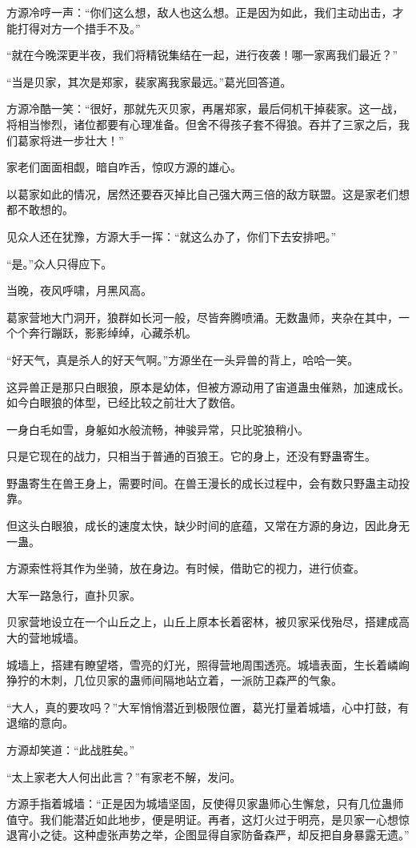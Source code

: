 \begin{this_body}
方源冷哼一声：“你们这么想，敌人也这么想。正是因为如此，我们主动出击，才能打得对方一个措手不及。”

“就在今晚深更半夜，我们将精锐集结在一起，进行夜袭！哪一家离我们最近？”

“当是贝家，其次是郑家，裴家离我家最远。”葛光回答道。

方源冷酷一笑：“很好，那就先灭贝家，再屠郑家，最后伺机干掉裴家。这一战，将相当惨烈，诸位都要有心理准备。但舍不得孩子套不得狼。吞并了三家之后，我们葛家将进一步壮大！”

家老们面面相觑，暗自咋舌，惊叹方源的雄心。

以葛家如此的情况，居然还要吞灭掉比自己强大两三倍的敌方联盟。这是家老们想都不敢想的。

见众人还在犹豫，方源大手一挥：“就这么办了，你们下去安排吧。”

“是。”众人只得应下。

当晚，夜风呼啸，月黑风高。

葛家营地大门洞开，狼群如长河一般，尽皆奔腾喷涌。无数蛊师，夹杂在其中，一个个奔行蹦跃，影影绰绰，心藏杀机。

“好天气，真是杀人的好天气啊。”方源坐在一头异兽的背上，哈哈一笑。

这异兽正是那只白眼狼，原本是幼体，但被方源动用了宙道蛊虫催熟，加速成长。如今白眼狼的体型，已经比较之前壮大了数倍。

一身白毛如雪，身躯如水般流畅，神骏异常，只比驼狼稍小。

只是它现在的战力，只相当于普通的百狼王。它的身上，还没有野蛊寄生。

野蛊寄生在兽王身上，需要时间。在兽王漫长的成长过程中，会有数只野蛊主动投靠。

但这头白眼狼，成长的速度太快，缺少时间的底蕴，又常在方源的身边，因此身无一蛊。

方源索性将其作为坐骑，放在身边。有时候，借助它的视力，进行侦查。

大军一路急行，直扑贝家。

贝家营地设立在一个山丘之上，山丘上原本长着密林，被贝家采伐殆尽，搭建成高大的营地城墙。

城墙上，搭建有瞭望塔，雪亮的灯光，照得营地周围透亮。城墙表面，生长着嶙峋狰狞的木刺，几位贝家的蛊师间隔地站立着，一派防卫森严的气象。

“大人，真的要攻吗？”大军悄悄潜近到极限位置，葛光打量着城墙，心中打鼓，有退缩的意向。

方源却笑道：“此战胜矣。”

“太上家老大人何出此言？”有家老不解，发问。

方源手指着城墙：“正是因为城墙坚固，反使得贝家蛊师心生懈怠，只有几位蛊师值守。我们能潜近如此地步，便是明证。再者，这灯火过于明亮，是贝家一心想惊退宵小之徒。这种虚张声势之举，企图显得自家防备森严，却反把自身暴露无遗。”


\end{this_body}
